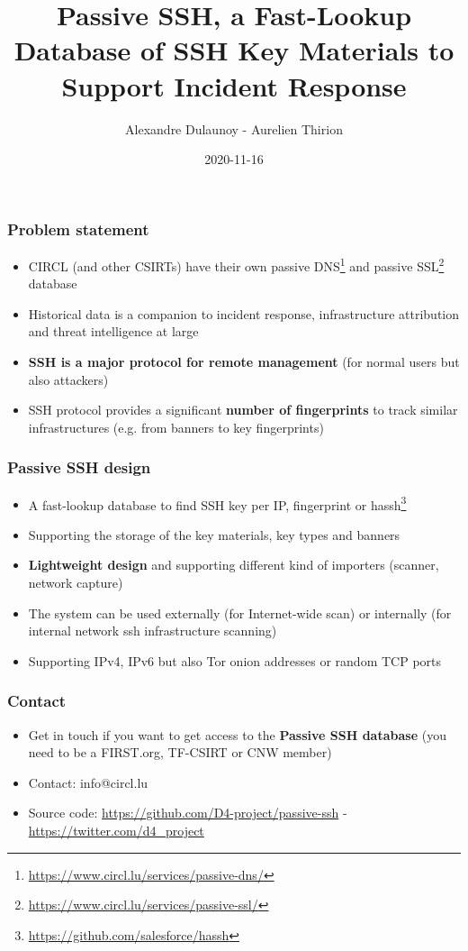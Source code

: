 \documentclass{beamer}
\title{Passive SSH, a Fast-Lookup Database of SSH Key Materials to Support Incident Response}
\subtitle{}
\author{Alexandre Dulaunoy - Aurelien Thirion}
\institute{Team CIRCL \\ \url{https://www.d4-project.org/}}
\date{2020-11-16}
\begin{document}
    \begin{frame}
        \maketitle
    \end{frame}

\begin{frame}
        \frametitle{Problem statement}
        \begin{itemize}
                \item CIRCL (and other CSIRTs) have their own passive DNS\footnote{\url{https://www.circl.lu/services/passive-dns/}} and passive SSL{\footnote{\url{https://www.circl.lu/services/passive-ssl/}}} database
                \item Historical data is a companion to incident response, infrastructure attribution and threat intelligence at large
                \item {\bf SSH is a major protocol for remote management} (for normal users but also attackers)
                \item SSH protocol provides a significant {\bf number of fingerprints} to track similar infrastructures (e.g. from banners to key fingerprints)
        \end{itemize}
\end{frame}

\begin{frame}
        \frametitle{Passive SSH design}
        \begin{itemize}
                \item A fast-lookup database to find SSH key per IP, fingerprint or hassh\footnote{\url{https://github.com/salesforce/hassh}}
                \item Supporting the storage of the key materials, key types and banners
                \item {\bf Lightweight design} and supporting different kind of importers (scanner, network capture)
                \item The system can be used externally (for Internet-wide scan) or internally (for internal network ssh infrastructure scanning)
                \item Supporting IPv4, IPv6 but also Tor onion addresses or random TCP ports
        \end{itemize}
\end{frame}


\begin{frame}
\frametitle{Contact}
\begin{itemize}
        \item Get in touch if you want to get access to the {\bf Passive SSH database} (you need to be a FIRST.org, TF-CSIRT or CNW member)
\item Contact: info@circl.lu
\item Source code: \url{https://github.com/D4-project/passive-ssh} -  \url{https://twitter.com/d4_project}
\end{itemize}
\end{frame}
\end{document}
